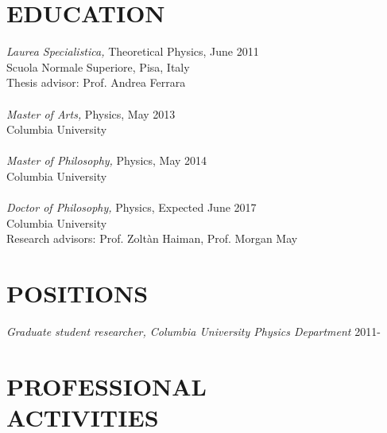 \documentclass[margin]{res} %
\begin{document}
\begin{resume}


\section{EDUCATION}

{\sl Laurea Specialistica,} Theoretical Physics, June 2011 \\
Scuola Normale Superiore, Pisa, Italy \\ 
Thesis advisor: Prof. Andrea Ferrara \\ \\ 
{\sl Master of Arts,} Physics, May 2013 \\ 
Columbia University \\ \\ 
{\sl Master of Philosophy,} Physics, May 2014 \\ 
Columbia University \\ \\ 
{\sl Doctor of Philosophy,} Physics, Expected June 2017 \\ 
Columbia University \\
Research advisors: Prof. Zolt\`an Haiman, Prof. Morgan May
 
 
\section{POSITIONS}

{\sl Graduate student researcher, Columbia University Physics Department} \hfill 2011- \\


\section{PROFESSIONAL \\ ACTIVITIES} 


\end{resume}
\end{document}
